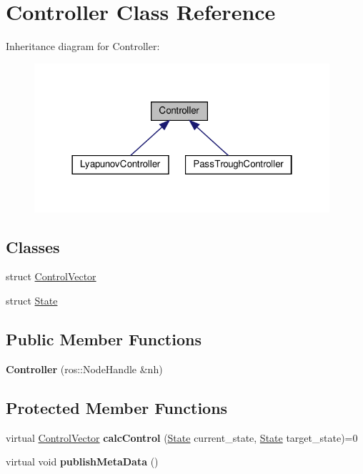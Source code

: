 \hypertarget{classController}{}\section{Controller Class Reference}
\label{classController}


Inheritance diagram for Controller\+:\nopagebreak
\begin{figure}[H]
\begin{center}
\leavevmode
\includegraphics[width=310pt]{dc/d30/classController__inherit__graph}
\end{center}
\end{figure}
\subsection*{Classes}
\begin{DoxyCompactItemize}
\item 
struct \hyperlink{structController_1_1ControlVector}{Control\+Vector}
\item 
struct \hyperlink{structController_1_1State}{State}
\end{DoxyCompactItemize}
\subsection*{Public Member Functions}
\begin{DoxyCompactItemize}
\item 
\mbox{\label{classController_a7341f9092e1977cdd2a1492c4422c019}} 
{\bfseries Controller} (ros\+::\+Node\+Handle \&nh)
\end{DoxyCompactItemize}
\subsection*{Protected Member Functions}
\begin{DoxyCompactItemize}
\item 
\mbox{\label{classController_a190a3955517e39310a4b715a883cbe02}} 
virtual \hyperlink{structController_1_1ControlVector}{Control\+Vector} {\bfseries calc\+Control} (\hyperlink{structController_1_1State}{State} current\+\_\+state, \hyperlink{structController_1_1State}{State} target\+\_\+state)=0
\item 
\mbox{\label{classController_a95ac558f7a8d570ba4f0ba12182de8c5}} 
virtual void {\bfseries publish\+Meta\+Data} ()
\end{DoxyCompactItemize}
